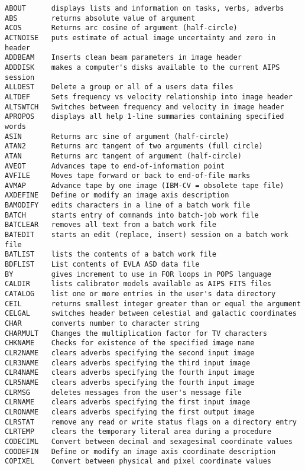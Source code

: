\begin{verbatim}
ABOUT      displays lists and information on tasks, verbs, adverbs
ABS        returns absolute value of argument
ACOS       Returns arc cosine of argument (half-circle)
ACTNOISE   puts estimate of actual image uncertainty and zero in header
ADDBEAM    Inserts clean beam parameters in image header
ADDDISK    makes a computer's disks available to the current AIPS session
ALLDEST    Delete a group or all of a users data files
ALTDEF     Sets frequency vs velocity relationship into image header
ALTSWTCH   Switches between frequency and velocity in image header
APROPOS    displays all help 1-line summaries containing specified words
ASIN       Returns arc sine of argument (half-circle)
ATAN2      Returns arc tangent of two arguments (full circle)
ATAN       Returns arc tangent of argument (half-circle)
AVEOT      Advances tape to end-of-information point
AVFILE     Moves tape forward or back to end-of-file marks
AVMAP      Advance tape by one image (IBM-CV = obsolete tape file)
AXDEFINE   Define or modify an image axis description
BAMODIFY   edits characters in a line of a batch work file
BATCH      starts entry of commands into batch-job work file
BATCLEAR   removes all text from a batch work file
BATEDIT    starts an edit (replace, insert) session on a batch work file
BATLIST    lists the contents of a batch work file
BDFLIST    List contents of EVLA ASD data file
BY         gives increment to use in FOR loops in POPS language
CALDIR     lists calibrator models available as AIPS FITS files
CATALOG    list one or more entries in the user's data directory
CEIL       returns smallest integer greater than or equal the argument
CELGAL     switches header between celestial and galactic coordinates
CHAR       converts number to character string
CHARMULT   Changes the multiplication factor for TV characters
CHKNAME    Checks for existence of the specified image name
CLR2NAME   clears adverbs specifying the second input image
CLR3NAME   clears adverbs specifying the third input image
CLR4NAME   clears adverbs specifying the fourth input image
CLR5NAME   clears adverbs specifying the fourth input image
CLRMSG     deletes messages from the user's message file
CLRNAME    clears adverbs specifying the first input image
CLRONAME   clears adverbs specifying the first output image
CLRSTAT    remove any read or write status flags on a directory entry
CLRTEMP    clears the temporary literal area during a procedure
CODECIML   Convert between decimal and sexagesimal coordinate values
COODEFIN   Define or modify an image axis coordinate description
COPIXEL    Convert between physical and pixel coordinate values

\end{verbatim}
